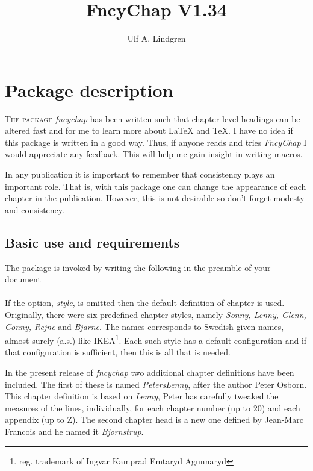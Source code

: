 \documentclass{report}
\title{FncyChap V1.34}
\author{Ulf A. Lindgren}
\date{}
\newcommand{\sk}{\vspace{0.2 cm}}
\newcommand{\A}[1]{{$\backslash${\tt #1}}}
\newcommand{\nsp}{\mbox{\hspace{-1 cm}}}
\begin{document}
  \maketitle
  \tableofcontents
  \chapter{Package description}
    \lettrine{T}{he package} \textsl{fncychap} has been written such that
    chapter level headings can be altered fast and for me to learn more
    about \LaTeX{} and \TeX{}. I have no idea if this package is
    written in a good way. Thus, if anyone reads and tries {\em
    FncyChap} I would appreciate any feedback. This will help me gain
  insight in writing macros. 
    
    In any publication it is important to remember that consistency
    plays an important role. That is, with this package one can change
    the appearance of each chapter in the publication. However, this is
    not desirable so don't forget modesty and consistency.

    \section{Basic use and requirements}
    The package is invoked by writing the following in the preamble of
    your document\sk\\
    \nsp\fbox{\A{usepackage}[{\em style}]\{{\em fncychap}\}}\sk\\
    If the option, {\em style}, is omitted then the default definition
    of chapter is used. Originally, there were six predefined chapter styles,
    namely {\em Sonny, Lenny, Glenn, Conny, Rejne} and {\em Bjarne}.
    The names corresponds to Swedish given names, almost surely (a.s.)
    like
    IKEA\footnote{reg. trademark of Ingvar Kamprad Emtaryd
    Agunnaryd}. Each such style has a default configuration and if
    that configuration is sufficient, then this is all that is needed.
    
    In the present release of \textsl{fncychap} two additional chapter
    definitions have been included. The first of these is named {\em
      PetersLenny}, after the author Peter Osborn. This chapter
    definition is based on {\em Lenny}, Peter has carefully tweaked
    the measures of the lines, individually, for each chapter number (up to 20)
    and each appendix (up to Z). The second chapter head is a new one
    defined by Jean-Marc Francois and he named it \textsl{Bjornstrup}.
\end{document}
